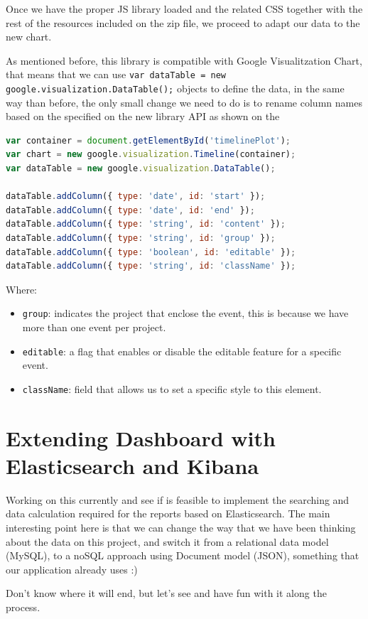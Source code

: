 Once we have the proper JS library loaded and the related CSS together with the
rest of the resources included on the zip file, we proceed to adapt our data to
the new chart.

As mentioned before, this library is compatible with Google Visualitzation
Chart, that means that we can use \texttt{var dataTable = new
google.visualization.DataTable();} objects to define the data, in the same way
than before, the only small change we need to do is to rename column names based
on the specified on the new library API as shown on the 

\begin{lstlisting}[language=Javascript,breaklines=true,caption=CHAP\ Link\
library,label=f_interactivetimelines_code]
var container = document.getElementById('timelinePlot');
var chart = new google.visualization.Timeline(container);
var dataTable = new google.visualization.DataTable();

dataTable.addColumn({ type: 'date', id: 'start' });
dataTable.addColumn({ type: 'date', id: 'end' });
dataTable.addColumn({ type: 'string', id: 'content' });
dataTable.addColumn({ type: 'string', id: 'group' });
dataTable.addColumn({ type: 'boolean', id: 'editable' });
dataTable.addColumn({ type: 'string', id: 'className' });
\end{lstlisting} 

Where:
\begin{itemize}
  \item \texttt{group}: indicates the project that enclose the event, this is
  because we have more than one event per project.
  \item \texttt{editable}: a flag that enables or disable the editable feature
  for a specific event.
  \item \texttt{className}: field that allows us to set a specific style to this
  element.
\end{itemize}

\chapter{Extending Dashboard with Elasticsearch and Kibana}
Working on this currently and see if is feasible to implement the searching and
data calculation required for the reports based on Elasticsearch. The
main interesting point here is that we can change the way that we have been
thinking about the data on this project, and switch it from a relational data
model (MySQL), to a noSQL approach using Document model (JSON), something that our
application already uses :)

Don't know where it will end, but let's see and have fun with it along the
process.

